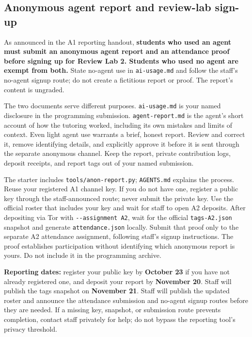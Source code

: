 \documentclass[11pt]{article}
\begin{document}
\subsection*{Anonymous agent report and review-lab sign-up}

As announced in the A1 reporting handout, \textbf{students who used an agent must submit an anonymous agent report and an attendance proof before signing up for Review Lab 2. Students who used no agent are exempt from both.} State no-agent use in \texttt{ai-{}usage.md} and follow the staff's no-agent signup route; do not create a fictitious report or proof. The report's content is ungraded.

The two documents serve different purposes. \texttt{ai-{}usage.md} is your named disclosure in the programming submission. \texttt{agent-{}report.md} is the agent's short account of how the tutoring worked, including its own mistakes and limits of context. Even light agent use warrants a brief, honest report. Review and correct it, remove identifying details, and explicitly approve it before it is sent through the separate anonymous channel. Keep the report, private contribution logs, deposit receipts, and report tags out of your named submission.

The starter includes \texttt{tools/anon-{}report.py}; \texttt{AGENTS.md} explains the process. Reuse your registered A1 channel key. If you do not have one, register a public key through the staff-announced route; never submit the private key. Use the official roster that includes your key and wait for staff to open A2 deposits. After depositing via Tor with \texttt{-{}-{}assignment A2}, wait for the official \texttt{tags-{}A2.json} snapshot and generate \texttt{attendance.json} locally. Submit that proof only to the separate A2 attendance assignment, following staff's signup instructions. The proof establishes participation without identifying which anonymous report is yours. Do not include it in the programming archive.

\textbf{Reporting dates:} register your public key by \textbf{October 23} if you have not already registered one, and deposit your report by \textbf{November 20}. Staff will publish the tags snapshot on \textbf{November 21}. Staff will publish the updated roster and announce the attendance submission and no-agent signup routes before they are needed. If a missing key, snapshot, or submission route prevents completion, contact staff privately for help; do not bypass the reporting tool's privacy threshold.
\end{document}

